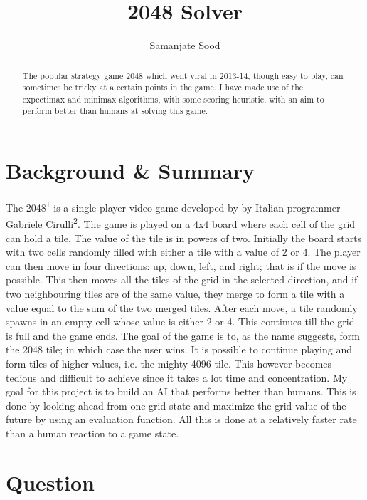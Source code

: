 \documentclass[english]{article}
\begin{document}
\title{2048 Solver}

\author{Samanjate Sood}

\maketitle
\thispagestyle{fancy}

\begin{abstract}
The popular strategy game 2048 which went viral in 2013-14, though easy to play, can sometimes be tricky at a certain points in the game. I have made use of the expectimax and minimax algorithms, with some scoring heuristic, with an aim to perform better than humans at solving this game.
\end{abstract}

\section*{Background \& Summary}

The 2048\textsuperscript{1} is a single-player video game developed by
by Italian programmer Gabriele Cirulli\textsuperscript{2}. The game is played on a 4x4 board where each cell of the grid can hold a tile. The value of the tile is in powers of two. Initially the board starts with two cells randomly filled with either a tile with a value of 2 or 4. The player can then move in four directions: up, down, left, and right; that is if the move is possible. This then moves all the tiles of the grid in the selected direction, and if two neighbouring tiles are of the same value, they merge to form a tile with a value equal to the sum of the two merged tiles. After each move, a tile randomly spawns in an empty cell whose value is either 2 or 4. This continues till the grid is full and the game ends. The goal of the game is to, as the name suggests, form the 2048 tile; in which case the user wins. It is possible to continue playing and form tiles of higher values, i.e. the mighty 4096 tile. This however becomes tedious and difficult to achieve since it takes a lot time and concentration. My goal for this project is to build an AI that performs better than humans. This is done by looking ahead from one grid state and maximize the grid value of the future by using an evaluation function. All this is done at a relatively faster rate than a human reaction to a game state.

\section*{Question}
\end{document}
